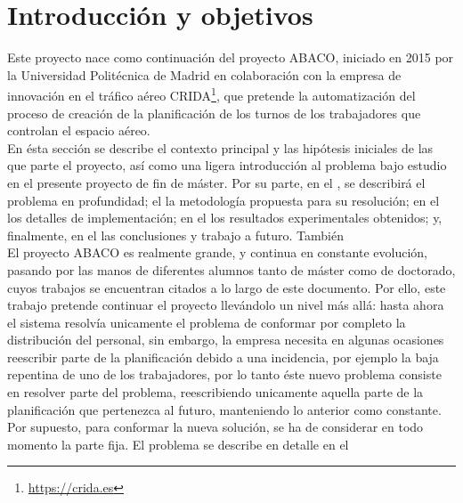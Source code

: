 \graphicspath{{capitulos/Capitulo1-Introduccion/recursos/}}


\section{Introducción y objetivos}

Este proyecto nace como continuación del proyecto ABACO, iniciado en 2015 por la Universidad Politécnica de Madrid en colaboración con la empresa de innovación en el tráfico aéreo CRIDA\footnote{\url{https://crida.es}}, que pretende la automatización del proceso de creación de la planificación de los turnos de los trabajadores que controlan el espacio aéreo.
\\

En ésta sección se describe el contexto principal y las hipótesis iniciales de las que parte el proyecto, así como una ligera introducción al problema bajo estudio en el presente proyecto de fin de máster. Por su parte, en el ,  se describirá el problema en profundidad; el  la metodología propuesta para su resolución; en el  los detalles de implementación; en el  los resultados experimentales obtenidos; y, finalmente, en el  las conclusiones y trabajo a futuro. También  %
\\

El proyecto ABACO es realmente grande, y continua en constante evolución, pasando por las manos de diferentes alumnos tanto de máster como de doctorado, cuyos trabajos se encuentran citados a lo largo de este documento. Por ello, este trabajo pretende continuar el proyecto llevándolo un nivel más allá: hasta ahora el sistema resolvía unicamente el problema de conformar por completo la distribución del personal, sin embargo, la empresa necesita en algunas ocasiones reescribir parte de la planificación debido a una incidencia, por ejemplo la baja repentina de uno de los trabajadores, por lo tanto éste nuevo problema consiste en resolver parte del problema, reescribiendo unicamente aquella parte de la planificación que pertenezca al futuro, manteniendo lo anterior como constante. Por supuesto, para conformar la nueva solución, se ha de considerar en todo momento la parte fija. El problema se describe en detalle en el 
\\

